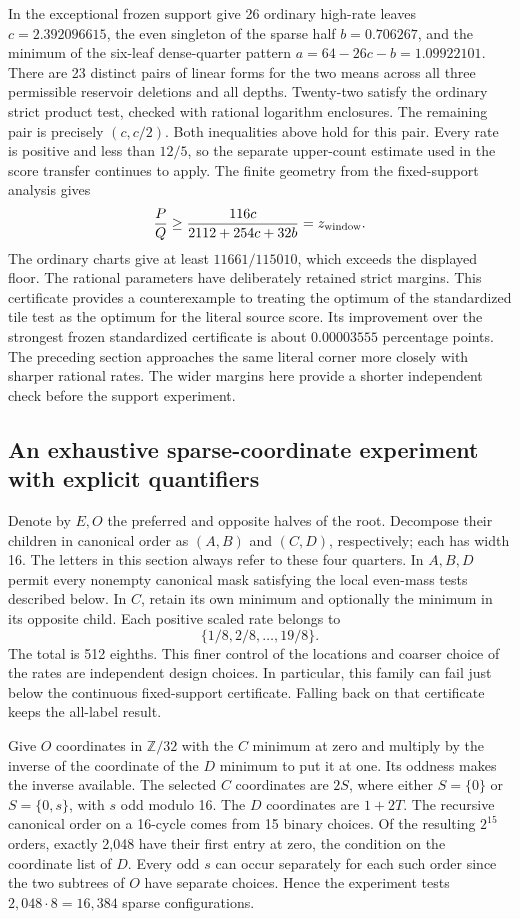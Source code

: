 \documentclass[12pt,letterpaper]{article}
\begin{document}
In the exceptional frozen support give 26 ordinary high-rate leaves \(c=2.392096615\), the even singleton of the sparse half \(b=0.706267\), and the minimum of the six-leaf dense-quarter pattern \(a=64-26c-b=1.09922101\). There are 23 distinct pairs of linear forms for the two means across all three permissible reservoir deletions and all depths. Twenty-two satisfy the ordinary strict product test, checked with rational logarithm enclosures. The remaining pair is precisely \((c,c/2)\). Both inequalities above hold for this pair. Every rate is positive and less than \(12/5\), so the separate upper-count estimate used in the score transfer continues to apply. The finite geometry from the fixed-support analysis gives
\[
                 \frac PQ\ge\frac{116c}{2112+254c+32b}
                    =z_{\rm window}.
\]
The ordinary charts give at least \(11661/115010\), which exceeds the displayed floor. The rational parameters have deliberately retained strict margins. This certificate provides a counterexample to treating the optimum of the standardized tile test as the optimum for the literal source score. Its improvement over the strongest frozen standardized certificate is about \(0.00003555\) percentage points. The preceding section approaches the same literal corner more closely with sharper rational rates. The wider margins here provide a shorter independent check before the support experiment.

\subsection{An exhaustive sparse-coordinate experiment with explicit quantifiers}

Denote by \(E,O\) the preferred and opposite halves of the root. Decompose their children in canonical order as \((A,B)\) and \((C,D)\), respectively; each has width 16. The letters in this section always refer to these four quarters. In \(A,B,D\) permit every nonempty canonical mask satisfying the local even-mass tests described below. In \(C\), retain its own minimum and optionally the minimum in its opposite child. Each positive scaled rate belongs to
\[
            \{1/8,2/8,\ldots,19/8\}.
\]
The total is 512 eighths. This finer control of the locations and coarser choice of the rates are independent design choices. In particular, this family can fail just below the continuous fixed-support certificate. Falling back on that certificate keeps the all-label result.

Give \(O\) coordinates in \(\mathbb Z/32\) with the \(C\) minimum at zero and multiply by the inverse of the coordinate of the \(D\) minimum to put it at one. Its oddness makes the inverse available. The selected \(C\) coordinates are \(2S\), where either \(S=\{0\}\) or \(S=\{0,s\}\), with \(s\) odd modulo 16. The \(D\) coordinates are \(1+2T\). The recursive canonical order on a 16-cycle comes from 15 binary choices. Of the resulting \(2^{15}\) orders, exactly 2,048 have their first entry at zero, the condition on the coordinate list of \(D\). Every odd \(s\) can occur separately for each such order since the two subtrees of \(O\) have separate choices. Hence the experiment tests \(2{,}048\cdot8=16{,}384\) sparse configurations.
\end{document}
